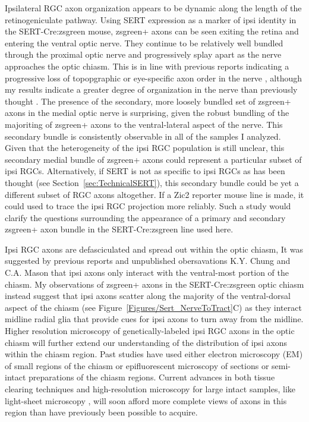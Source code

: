 Ipsilateral RGC axon organization appears to be dynamic along the length of the retinogeniculate pathway.
Using SERT expression as a marker of ipsi identity in the SERT-Cre:zsgreen mouse, zsgreen+ axons can be seen exiting the retina and entering the ventral optic nerve.
They continue to be relatively well bundled through the proximal optic nerve and progressively splay apart as the nerve approaches the optic chiasm.
This is in line with previous reports indicating a progressive loss of topopgraphic or eye-specific axon order in the nerve \cite{colello1990early,chan1994changes,chan1999changes}, although my results indicate a greater degree of organization in the nerve than previously thought \cite{colello1990early,baker1989distribution}.
The presence of the secondary, more loosely bundled set of zsgreen+ axons in the medial optic nerve is surprising, given the robust bundling of the majoriting of zsgreen+ axons to the ventral-lateral aspect of the nerve.
This secondary bundle is consistently observable in all of the samples I analyzed.
Given that the heterogeneity of the ipsi RGC population is still unclear, this secondary medial bundle of zsgreen+ axons could represent a particular subset of ipsi RGCs.
Alternatively, if SERT is not as specific to ipsi RGCs as has been thought (see Section~\ref{sec:TechnicalSERT}), this secondary bundle could be yet a different subset of RGC axons altogether.
If a Zic2 reporter mouse line is made, it could used to trace the ipsi RGC projection more reliably.
Such a study would clarify the questions surrounding the appearance of a primary and secondary zsgreen+ axon bundle in the SERT-Cre:zsgreen line used here.

Ipsi RGC axons are defasciculated and spread out within the optic chiasm, 
It was suggested by previous reports \cite{colello1997changing} and unpublished obersavations {K.Y. Chung and C.A. Mason} that ipsi axons only interact with the ventral-most portion of the chiasm.
My observations of zsgreen+ axons in the SERT-Cre:zsgreen optic chiasm instead suggest that ipsi axons scatter along the majority of the ventral-dorsal aspect of the chiasm (see Figure~\ref{Figures/Sert_NerveToTract}C) as they interact midline radial glia that provide cues for ipsi axons to turn away from the midline.
Higher resolution microscopy of genetically-labeled ipsi RGC axons in the optic chiasm will further extend our understanding of the distribution of ipsi axons within the chiasm region.
Past studies have used either electron microscopy (EM) of small regions of the chiasm or epifluorescent microscopy of sections or semi-intact preparations of the chiasm regions. %
Current advances in both tissue clearing techniques \cite{tainaka2015chemical} and high-resolution microscopy for large intact samples, like light-sheet microscopy \cite{keller2015visualizing}, will soon afford more complete views of axons in this region than have previously been possible to acquire.

